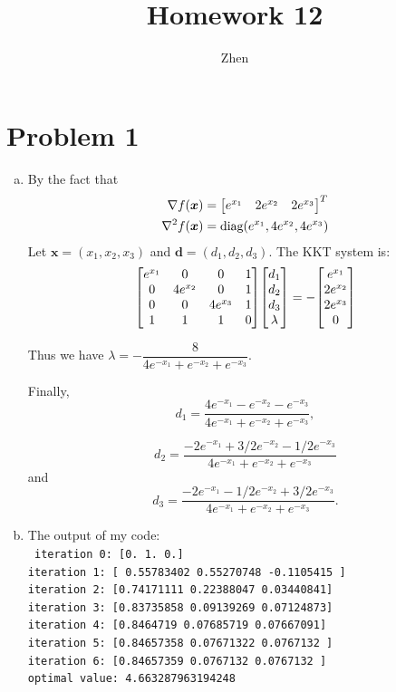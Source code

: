 \documentclass{article}
\def\bd{\boldsymbol{d}}
\def\bx{\boldsymbol{x}}
\begin{document}
\title{Homework 12}
\author{Zhen}
\maketitle

\section*{Problem 1}

\begin{enumerate}[(a)]
    \item
		By the fact that
		\[
		    \begin{aligned}
				\nabla f(\bx)&=
				\mqty[e^{x_1} & 2e^{x_2} & 2e^{x_3}]^T
				\\
				\nabla^2 f(\bx)&=
				\mbox{diag}(e^{x_1},4e^{x_2},4e^{x_3})
		    \end{aligned}
		\]
		Let $\bx=(x_1,x_2,x_3)$ and $\bd=(d_1,d_2,d_3)$. The KKT system is:
		\[
			\mqty[
				e^{x_1} & 0 & 0 & 1 \\
				0 & 4e^{x_2} & 0 & 1 \\
				0 & 0 & 4e^{x_3} & 1 \\
				1 & 1 & 1 & 0
			]
			\mqty[d_1 \\ d_2 \\ d_3 \\ \lambda]
			=
			-\mqty[e^{x_1} \\ 2e^{x_2} \\ 2e^{x_3} \\ 0]
		\]

		Thus we have $\lambda=-\dfrac{8}{4e^{-x_1}+e^{-x_2}+e^{-x_3}}$.
		
		Finally,
		\[
			d_1=
			\dfrac{4e^{-x_1}-e^{-x_2}-e^{-x_3}}
			{4e^{-x_1}+e^{-x_2}+e^{-x_3}}
		,\]

		\[
			d_2=
			\dfrac{-2e^{-x_1}+3/2e^{-x_2}-1/2e^{-x_3}}
			{4e^{-x_1}+e^{-x_2}+e^{-x_3}}
		\] and
		\[
			d_3=
			\dfrac{-2e^{-x_1}-1/2e^{-x_2}+3/2e^{-x_3}}
			{4e^{-x_1}+e^{-x_2}+e^{-x_3}}
		.\]
    \item
		The output of my code:
		\\
		\texttt{
			iteration 0: [0. 1. 0.]\\
			iteration 1: [ 0.55783402  0.55270748 -0.1105415 ]\\
			iteration 2: [0.74171111 0.22388047 0.03440841]\\
			iteration 3: [0.83735858 0.09139269 0.07124873]\\
			iteration 4: [0.8464719  0.07685719 0.07667091]\\
			iteration 5: [0.84657358 0.07671322 0.0767132 ]\\
			iteration 6: [0.84657359 0.0767132  0.0767132 ]\\
			optimal value: 4.663287963194248
		}
\end{enumerate}
\end{document}
